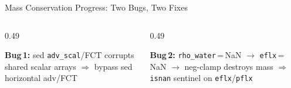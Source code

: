 \documentclass[aspectratio=169,10pt]{beamer}
\begin{document}
\begin{frame}{Mass Conservation Progress: Two Bugs, Two Fixes}
\begin{columns}[T]
  \end{columns}

  \vspace{0.1em}
  \begin{columns}[T]
    \begin{column}{0.49\textwidth}
      \centering
      \colorbox{red!15}{\parbox{0.95\textwidth}{\centering\footnotesize
        \textbf{Bug\,1:} sed \texttt{adv\_scal}/FCT corrupts shared scalar arrays
        $\Rightarrow$ bypass sed horizontal adv/FCT
      }}
    \end{column}
    \begin{column}{0.49\textwidth}
      \centering
      \colorbox{red!15}{\parbox{0.95\textwidth}{\centering\footnotesize
        \textbf{Bug\,2:} \texttt{rho\_water}\,=\,NaN $\to$ \texttt{eflx}\,=\,NaN
        $\to$ neg-clamp destroys mass
        $\Rightarrow$ \texttt{isnan} sentinel on \texttt{eflx}/\texttt{pflx}
      }}
    \end{column}
  \end{columns}

\end{frame}
\end{document}
